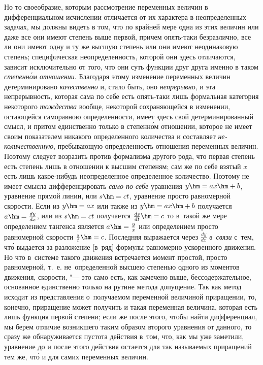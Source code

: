 \label{bkm:bm53c}Но то своеобразие, которым рассмотрение переменных величин в
дифференциальном исчислении отличается от их характера в неопределенных
задачах, мы должны видеть в том, что по крайней мере одна из этих величин или
даже все они имеют степень выше первой, причем опять-таки безразлично, все ли
они имеют одну и ту же высшую степень или они имеют неодинаковую степень;
специфическая неопределенность, которой они здесь отличаются, зависит
исключительно от того, что они суть функции друг друга именно в таком
{\em степенн\'{о}м отношении}. Благодаря этому изменение переменных величин
детерминировано {\em качественно} и, стало быть, оно {\em непрерывно}, и эта
непрерывность, которая сама по себе есть опять-таки лишь формальная категория
некоторого {\em тождества} вообще, некоторой сохраняющейся в изменении,
остающейся саморавною определенности, имеет здесь свой детерминированный смысл,
и притом единственно только в степенн\'{о}м отношении, которое не имеет своим
показателем никакого определенного количества и составляет
{\em не-количественную}, пребывающую определенность отношения переменных
величин. Поэтому следует возразить против формализма другого рода, что первая
степень есть степень лишь в отношении к высшим степеням; сам же по себе взятый
$x$ есть лишь какое-нибудь неопределенное определенное количество. Поэтому
не имеет смысла дифференцировать {\em само по себе} уравнения $y\hm=ax\hm+b$,
уравнение прямой линии, или $s\hm=ct$, уравнение просто равномерной скорости.
Если из $y\hm=ax$ или также из $y\hm=ax\hm+b$ получается $a\hm=\frac{dy}{dx}$,
или из $s\hm=ct$ получается $\frac{ds}{dt}\hm=c$ то в~такой же мере
определением тангенса является $a\hm=\frac y x$ или определением просто
равномерной скорости $\frac s t\hm=c$. Последняя выражается через
$\frac{dy}{dx}$ {\em в~связи} с~тем, чт\'{о} выдается за разложение [в~ряд]
формулы равномерно ускоренного движения. Но что в~системе такого движения
встречается момент простой, просто равномерной, т.~е. не~определенной высшею
степенью одного из моментов движения, скорости, "--- это само есть, как
замечено выше, бессодержательное, основанное единственно только на рутине
метода допущение. Так как метод исходит из представления о~получаемом
переменной величиной приращении, то, конечно, приращение может получить и такая
переменная величина, которая есть лишь функция первой степени; если же после
этого, чтобы найти дифференциал, мы берем отличие возникшего таким образом
второго уравнения от данного, то сразу же обнаруживается пустота действия
в~том, что, как мы уже заметили, уравнение до и после этого действия остается
для так называемых приращений тем же, чт\'{о} и для самих переменных величин.


